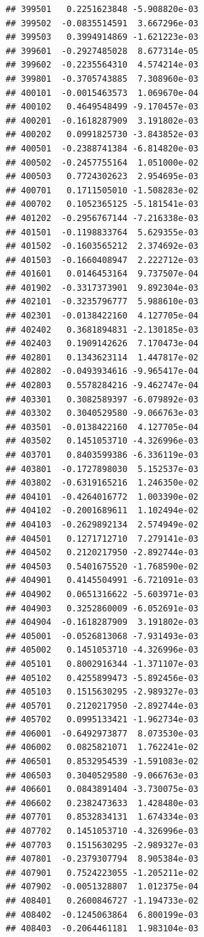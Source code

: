 \documentclass[ignorenonframetext,]{beamer}
\begin{document}
\begin{frame}[fragile]
\begin{verbatim}
## 399501   0.2251623848 -5.908820e-03
## 399502  -0.0835514591  3.667296e-03
## 399503   0.3994914869 -1.621223e-03
## 399601  -0.2927485028  8.677314e-05
## 399602  -0.2235564310  4.574214e-03
## 399801  -0.3705743885  7.308960e-03
## 400101  -0.0015463573  1.069670e-04
## 400102   0.4649548499 -9.170457e-03
## 400201  -0.1618287909  3.191802e-03
## 400202   0.0991825730 -3.843852e-03
## 400501  -0.2388741384 -6.814820e-03
## 400502  -0.2457755164  1.051000e-02
## 400503   0.7724302623  2.954695e-03
## 400701   0.1711505010 -1.508283e-02
## 400702   0.1052365125 -5.181541e-03
## 401202  -0.2956767144 -7.216338e-03
## 401501  -0.1198833764  5.629355e-03
## 401502  -0.1603565212  2.374692e-03
## 401503  -0.1660408947  2.222712e-03
## 401601   0.0146453164  9.737507e-04
## 401902  -0.3317373901  9.892304e-03
## 402101  -0.3235796777  5.988610e-03
## 402301  -0.0138422160  4.127705e-04
## 402402   0.3681894831 -2.130185e-03
## 402403   0.1909142626  7.170473e-04
## 402801   0.1343623114  1.447817e-02
## 402802  -0.0493934616 -9.965417e-04
## 402803   0.5578284216 -9.462747e-04
## 403301   0.3082589397 -6.079892e-03
## 403302   0.3040529580 -9.066763e-03
## 403501  -0.0138422160  4.127705e-04
## 403502   0.1451053710 -4.326996e-03
## 403701   0.8403599386 -6.336119e-03
## 403801  -0.1727898030  5.152537e-03
## 403802  -0.6319165216  1.246350e-02
## 404101  -0.4264016772  1.003390e-02
## 404102  -0.2001689611  1.102494e-02
## 404103  -0.2629892134  2.574949e-02
## 404501   0.1271712710  7.279141e-03
## 404502   0.2120217950 -2.892744e-03
## 404503   0.5401675520 -1.768590e-02
## 404901   0.4145504991 -6.721091e-03
## 404902   0.0651316622 -5.603971e-03
## 404903   0.3252860009 -6.052691e-03
## 404904  -0.1618287909  3.191802e-03
## 405001  -0.0526813068 -7.931493e-03
## 405002   0.1451053710 -4.326996e-03
## 405101   0.8002916344 -1.371107e-03
## 405102   0.4255899473 -5.892456e-03
## 405103   0.1515630295 -2.989327e-03
## 405701   0.2120217950 -2.892744e-03
## 405702   0.0995133421 -1.962734e-03
## 406001  -0.6492973877  8.073530e-03
## 406002   0.0825821071  1.762241e-02
## 406501   0.8532954539 -1.591083e-02
## 406503   0.3040529580 -9.066763e-03
## 406601   0.0843891404 -3.730075e-03
## 406602   0.2382473633  1.428480e-03
## 407701   0.8532834131  1.674334e-03
## 407702   0.1451053710 -4.326996e-03
## 407703   0.1515630295 -2.989327e-03
## 407801  -0.2379307794  8.905384e-03
## 407901   0.7524223055 -1.205211e-02
## 407902  -0.0051328807  1.012375e-04
## 408401   0.2600846727 -1.194733e-02
## 408402  -0.1245063864  6.800199e-03
## 408403  -0.2064461181  1.983104e-03

\end{verbatim}
\end{frame}
\end{document}
